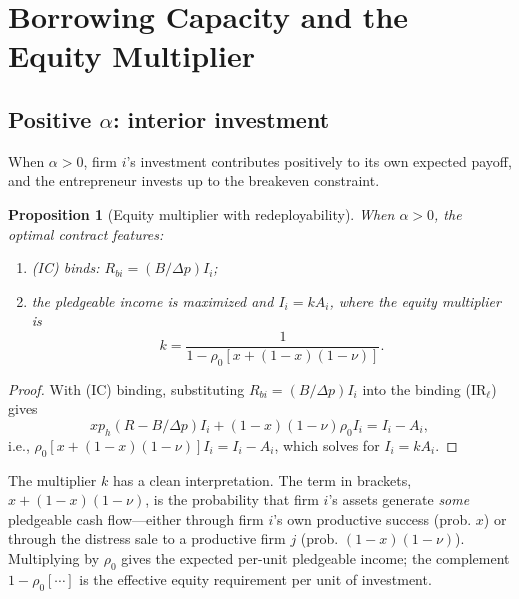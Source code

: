 \documentclass[11pt,a4paper,oneside]{book}
\theoremstyle{plain}
\newtheorem{proposition}[theorem]{Proposition}
\theoremstyle{definition}
\theoremstyle{remark}
\numberwithin{equation}{chapter}
\begin{document}
\section{Borrowing Capacity and the Equity Multiplier}
\label{sec:ma-multiplier}

\subsection{Positive $\alpha$: interior investment}

When $\alpha > 0$, firm $i$'s investment contributes positively to its own expected payoff, and the entrepreneur invests up to the breakeven constraint.

\begin{proposition}[Equity multiplier with redeployability]\label{prop:ma-multiplier}
When $\alpha > 0$, the optimal contract features:
\begin{enumerate}
  \item[\textup{(i)}] \emph{(IC)} binds: $R_{b i} = (B/\Delta p) I_i$;
  \item[\textup{(ii)}] the pledgeable income is maximized and $I_i = k A_i$, where the equity multiplier is
  \begin{equation}\label{eq:ma-k}
    k = \frac{1}{1 - \rho_0 [x + (1 - x)(1 - \nu)]}.
  \end{equation}
\end{enumerate}
\end{proposition}

\begin{proof}
With (IC) binding, substituting $R_{b i} = (B/\Delta p) I_i$ into the binding (IR$_\ell$) gives
\begin{equation*}
  x p_h (R - B/\Delta p) I_i + (1 - x)(1 - \nu) \rho_0 I_i = I_i - A_i,
\end{equation*}
i.e., $\rho_0 [x + (1 - x)(1 - \nu)] I_i = I_i - A_i$, which solves for $I_i = k A_i$.
\end{proof}

The multiplier $k$ has a clean interpretation.
The term in brackets, $x + (1 - x)(1 - \nu)$, is the probability that firm $i$'s assets generate \emph{some} pledgeable cash flow---either through firm $i$'s own productive success (prob. $x$) or through the distress sale to a productive firm $j$ (prob. $(1 - x)(1 - \nu)$).
Multiplying by $\rho_0$ gives the expected per-unit pledgeable income; the complement $1 - \rho_0[\cdots]$ is the effective equity requirement per unit of investment.
\end{document}
